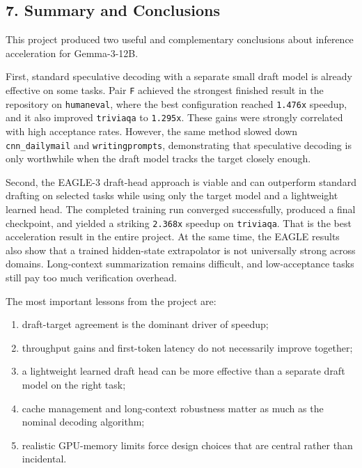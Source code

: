\documentclass[
]{article}
\begin{document}
\subsection{7. Summary and Conclusions}\label{7-summary-and-conclusions}

This project produced two useful and complementary conclusions about
inference acceleration for Gemma-3-12B.

First, standard speculative decoding with a separate small draft model
is already effective on some tasks. Pair \texttt{F} achieved the
strongest finished result in the repository on \texttt{humaneval}, where
the best configuration reached \texttt{1.476x} speedup, and it also
improved \texttt{triviaqa} to \texttt{1.295x}. These gains were strongly
correlated with high acceptance rates. However, the same method slowed
down \texttt{cnn\_dailymail} and \texttt{writingprompts}, demonstrating
that speculative decoding is only worthwhile when the draft model tracks
the target closely enough.

Second, the EAGLE-3 draft-head approach is viable and can outperform
standard drafting on selected tasks while using only the target model
and a lightweight learned head. The completed training run converged
successfully, produced a final checkpoint, and yielded a striking
\texttt{2.368x} speedup on \texttt{triviaqa}. That is the best
acceleration result in the entire project. At the same time, the EAGLE
results also show that a trained hidden-state extrapolator is not
universally strong across domains. Long-context summarization remains
difficult, and low-acceptance tasks still pay too much verification
overhead.

The most important lessons from the project are:

\begin{enumerate}
\def\labelenumi{\arabic{enumi}.}
\item
  draft-target agreement is the dominant driver of speedup;
\item
  throughput gains and first-token latency do not necessarily improve
  together;
\item
  a lightweight learned draft head can be more effective than a separate
  draft model on the right task;
\item
  cache management and long-context robustness matter as much as the
  nominal decoding algorithm;
\item
  realistic GPU-memory limits force design choices that are central
  rather than incidental.
\end{enumerate}
\end{document}
